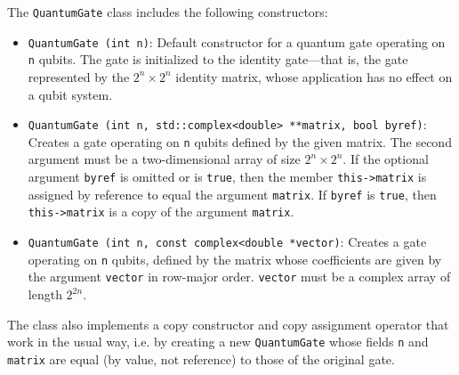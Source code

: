 \documentclass{article}
\begin{document}
The \verb~QuantumGate~ class includes the following constructors: 
\begin{itemize}
\item \verb~QuantumGate (int n)~: Default constructor for a quantum gate operating on \verb~n~ qubits. The gate is initialized to the identity gate---that is, the gate represented by the $2^n \times 2^n$ identity matrix, whose application has no effect on a qubit system. 

\item \verb~QuantumGate (int n, std::complex<double> **matrix, bool byref)~: Creates a gate operating on \verb~n~ qubits defined by the given matrix. The second argument must be a two-dimensional array of size $2^n \times 2^n$. If the optional argument \verb~byref~ is omitted or is \verb~true~, then the member \verb~this->matrix~ is assigned by reference to equal the argument \verb~matrix~. If \verb~byref~ is \verb~true~, then \verb~this->matrix~ is a copy of the argument \verb~matrix~. 

\item \verb~QuantumGate (int n, const complex<double *vector)~: Creates a gate operating on \verb~n~ qubits, defined by the matrix whose coefficients are given by the argument \verb~vector~ in row-major order. \verb~vector~ must be a complex array of length $2^{2n}$.

\end{itemize} 
The class also implements a copy constructor and copy assignment operator that work in the usual way, i.e. by creating a new \verb~QuantumGate~ whose fields \verb~n~ and \verb~matrix~ are equal (by value, not reference) to those of the original gate. 
\end{document}

